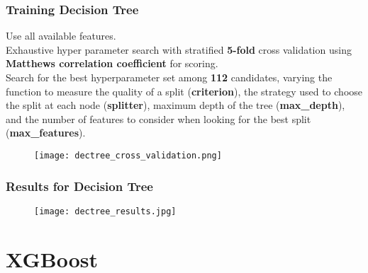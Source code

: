 \documentclass[11pt]{beamer}
\begin{document}
\begin{frame}[fragile]
  \frametitle{\normalsize{\textbf{
    Training Decision Tree
  }}} 

  \scriptsize{  

    \textbullet \: Use all available features. \\[0.25cm]

    \textbullet \: Exhaustive hyper parameter search with stratified \textbf{5-fold} 
    cross validation using \textbf{Matthews correlation coefficient} for scoring. \\[0.25cm]

    \textbullet \: Search for the best hyperparameter set among \textbf{112} candidates, 
    varying the function to measure the quality of a split (\textbf{criterion}), 
    the strategy used to choose the split at each node (\textbf{splitter}), maximum 
    depth of the tree (\textbf{max\_depth}), and the number of features to consider 
    when looking for the best split (\textbf{max\_features}). 

    \begin{figure}[h!]
      \centering
      \texttt{[image: dectree\_cross\_validation.png]}
    \end{figure}
  }
\end{frame}

\begin{frame}[fragile]
  \frametitle{\normalsize{\textbf{
    Results for Decision Tree
  }}} 

  \scriptsize{  

    \begin{figure}[h!]
      \centering
      \texttt{[image: dectree\_results.jpg]}
    \end{figure}  
  }
\end{frame}

\section{XGBoost}
\end{document}
